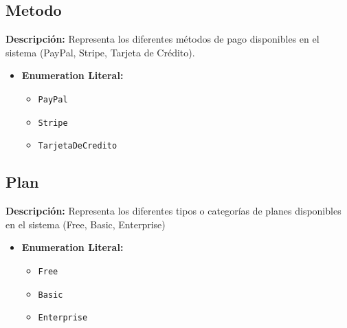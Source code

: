 \documentclass[12pt.a4paper]{article}
\begin{document}
\subsection{Metodo}
     \textbf{Descripción:} Representa los diferentes métodos de pago disponibles en el sistema (PayPal, Stripe, Tarjeta de Crédito).
    \begin{itemize}
        \item {\textbf{Enumeration Literal:}}
        \begin{itemize}
            \item \texttt{PayPal}
            \item \texttt{Stripe}
            \item \texttt{TarjetaDeCredito}
        \end{itemize}
    \end{itemize}


\subsection{Plan}
     \textbf{Descripción:}  Representa los diferentes tipos o categorías de planes disponibles en el sistema (Free, Basic, Enterprise)
    \begin{itemize}
        \item {\textbf{Enumeration Literal:}}
        \begin{itemize}
            \item \texttt{Free}
            \item \texttt{Basic}
            \item \texttt{Enterprise}
        \end{itemize}
    \end{itemize}
\end{document}
